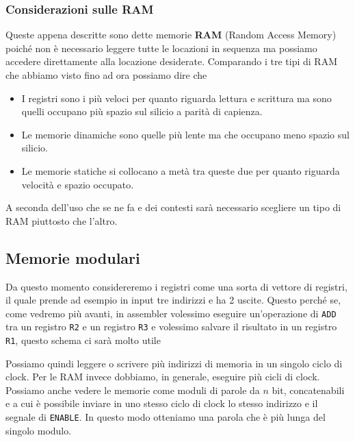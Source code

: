 \subsubsection{Considerazioni sulle RAM}
Queste appena descritte sono dette memorie \textbf{RAM} (Random Access Memory) poiché non è
necessario leggere tutte le locazioni in sequenza ma possiamo accedere direttamente alla locazione
desiderate. Comparando i tre tipi di RAM che abbiamo visto fino ad ora possiamo dire che
\begin{itemize}
	\item I registri sono i più veloci per quanto riguarda lettura e scrittura ma sono quelli
	      occupano più spazio sul silicio a parità di capienza.
	\item Le memorie dinamiche sono quelle più lente ma che occupano meno spazio sul silicio.
	\item Le memorie statiche si collocano a metà tra queste due per quanto riguarda velocità e
	      spazio occupato.
\end{itemize}
A seconda dell'uso che se ne fa e dei contesti sarà necessario scegliere un tipo di RAM piuttosto
che l'altro.

\subsection{Memorie modulari}
Da questo momento considereremo i registri come una sorta di vettore di registri, il quale prende
ad esempio in input tre indirizzi e ha 2 uscite. Questo perché se, come vedremo più avanti, in
assembler volessimo eseguire un'operazione di \verb|ADD| tra un registro \verb|R2| e un registro
\verb|R3| e volessimo salvare il risultato in un registro \verb|R1|, questo schema ci sarà molto
utile
\begin{center}
\end{center}
Possiamo quindi leggere o scrivere più indirizzi di memoria in un singolo ciclo di clock. Per le
RAM invece dobbiamo, in generale, eseguire più cicli di clock. Possiamo anche vedere le memorie
come moduli di parole da $n$ bit, concatenabili e a cui è possibile inviare in uno stesso ciclo di
clock lo stesso indirizzo e il segnale di \verb|ENABLE|. In questo modo otteniamo una parola che
è più lunga del singolo modulo.

